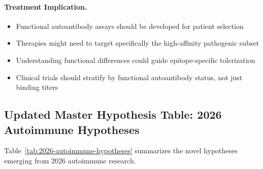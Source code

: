 \paragraph{Treatment Implication.}
\begin{itemize}
    \item Functional autoantibody assays should be developed for patient selection
    \item Therapies might need to target specifically the high-affinity pathogenic subset
    \item Understanding functional differences could guide epitope-specific tolerization
    \item Clinical trials should stratify by functional autoantibody status, not just binding titers
\end{itemize}

\subsection{Updated Master Hypothesis Table: 2026 Autoimmune Hypotheses}

Table~\ref{tab:2026-autoimmune-hypotheses} summarizes the novel hypotheses emerging from 2026 autoimmune research.

